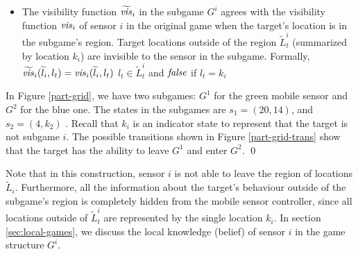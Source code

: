 \begin{itemize}
  \item The visibility function $\widetilde{\mathit{vis}}_i$ in the subgame $G^i$ agrees with the visibility function $\mathit{vis}_i$ of sensor $i$ in the original game when the target's location is in the subgame's region. Target locations outside of the region $\widetilde L_t^i$  (summarized by location $k_i$) are invisible to the sensor in the subgame. Formally, $\widetilde{\mathit{vis}}_i(\widetilde{l}_i,l_t) = \mathit{vis}_i(\widetilde{l}_i,l_t)$  $l_t \in \widetilde{L}_t^i$ and $\mathit{false}$ if $l_t  = k_i$
\end{itemize}
\begin{example}
In Figure \ref{part-grid}, we have two subgames: $G^1$ for the green mobile sensor and $G^2$ for the blue one. The states in the subgames are $s_1 = (20,14)$, and $s_2 = (4,k_2)$ . Recall that $k_i$ is an indicator state to represent that the target is not subgame $i$. The possible transitions shown in Figure \ref{part-grid-trans} show that the target has the ability to leave $G^1$ and enter $G^2$. 
\qed
\end{example}

Note that in this construction, sensor $i$ is not able to leave the region of locations $\widetilde{L}_i$. Furthermore, all the information about the target's behaviour outside of  the subgame's region is completely hidden from the mobile sensor controller, since all locations outside of  $\widetilde{L}_t^i$ are represented by the single location $k_i$.
In section \ref{sec:local-games}, we discuss the local knowledge (belief)  of sensor $i$ in the game structure $G^i$.
 
